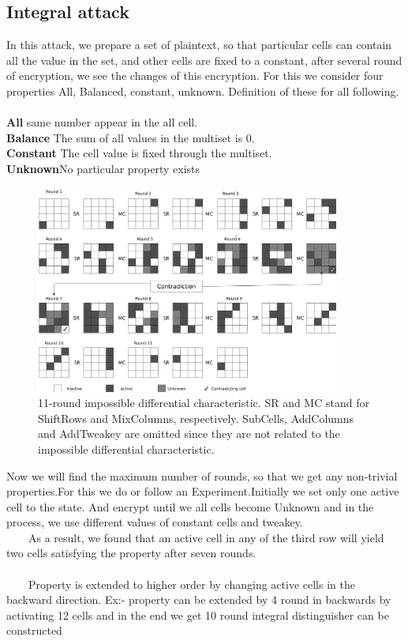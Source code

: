 \documentclass[preprint]{transcrypto}
\begin{document}
{\subsection{Integral attack}
\tab In this attack, we prepare a set of plaintext, so that particular cells can contain all the value in
the set, and other cells are fixed to a constant, after several round of encryption, we see the
changes of this encryption. For this we consider four properties All, Balanced, constant, unknown.
Definition of these for all following.\\ \\
\textbf{All} same number appear in the all cell.\\
\textbf{Balance} The sum of all values in the multiset is 0.\\
\textbf{Constant} The cell value is fixed through the multiset.\\
\textbf{Unknown}No particular property exists\\

\begin{figure}[H]
	\centering
			\caption{11-round impossible differential characteristic. SR and MC stand for ShiftRows and MixColumns, respectively. SubCells, AddColumns and AddTweakey are omitted since they are not related to the impossible differential characteristic.}
		\includegraphics[width=10cm]{fig3.png}
\end{figure}
Now we will find the maximum number of rounds, so that we get any non-trivial properties.For
this we do or follow an Experiment.Initially we set only one active cell to the state. And encrypt
until we all cells become Unknown and in the process, we use different values of constant cells
and tweakey.\\
\tab$\quad\quad$As a result, we found that an active cell in any of the third row will yield two cells satisfying the
property after seven rounds.\\ \\
\tab$\quad\quad$Property is extended to higher order by changing active cells in the backward direction.
Ex:- property can be extended by 4 round in backwards by activating 12 cells and in the end we
get 10 round integral distinguisher can be constructed

}
\end{document}
